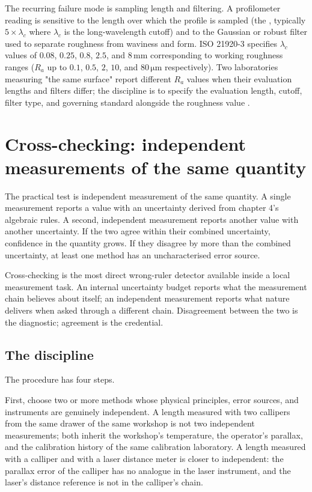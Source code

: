 The recurring failure mode is sampling length and filtering. A
profilometer reading is sensitive to the length over which the
profile is sampled (the , typically $5
\times \lambda_{c}$ where $\lambda_{c}$ is the long-wavelength
cutoff) and to the Gaussian or robust filter used to separate
roughness from waviness and form. ISO 21920-3 specifies
$\lambda_{c}$ values of $0.08$, $0.25$, $0.8$, $2.5$, and $8\,
\si{\milli\meter}$ corresponding to working roughness ranges
($R_{a}$ up to $0.1$, $0.5$, $2$, $10$, and $80\,\si{\micro
\meter}$ respectively). Two laboratories measuring "the same
surface" report different $R_{a}$ values when their evaluation
lengths and filters differ; the discipline is to specify the
evaluation length, cutoff, filter type, and governing standard
alongside the roughness value
\cite{std:iso-21920-2-2021}.

\section{Cross-checking: independent measurements of the same
quantity}

The practical test is independent measurement of the same quantity.
A single measurement reports a value with an uncertainty derived
from chapter 4's algebraic rules. A second, independent measurement
reports another value with another uncertainty. If the two agree
within their combined uncertainty, confidence in the quantity grows.
If they disagree by more than the combined uncertainty, at least one
method has an uncharacterised error source.

Cross-checking is the most direct wrong-ruler detector available
inside a local measurement task. An internal uncertainty budget
reports what the measurement chain believes about itself; an
independent measurement reports what nature delivers when asked
through a different chain. Disagreement between the two is the
diagnostic; agreement is the credential.

\subsection{The discipline}

The procedure has four steps.

First, choose two or more methods whose physical principles, error
sources, and instruments are genuinely independent. A length measured
with two callipers from the same drawer of the same workshop is not
two independent measurements; both inherit the workshop's
temperature, the operator's parallax, and the calibration history of
the same calibration laboratory. A length measured with a calliper
and with a laser distance meter is closer to independent: the
parallax error of the calliper has no analogue in the laser
instrument, and the laser's distance reference is not in the
calliper's chain.

